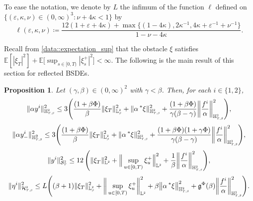 \documentclass[10pt]{article} %
\newtheorem{proposition}[theorem]{Proposition}
\newcommand\cH{\mathcal H}
\newcommand\cS{\mathcal S}
\newcommand{\smalltext}[1]{\text{\fontsize{4}{4}\selectfont$#1$}}
\newcommand\fg{\mathfrak g}
\def \E{\mathbb{E}}
\def \H{\mathbb{H}}
\def \L{\mathbb{L}}
\newcommand{\brs}[1]{\prescript{\ast}{}{#1}}
\begin{document}
To ease the notation, we denote by $L$ the infimum of the function $\ell$ defined on $\{(\varepsilon,\kappa,\nu) \in (0,\infty)^3 : \nu + 4\kappa < 1\}$ by
\begin{equation*}
	\ell(\varepsilon,\kappa,\nu) \coloneqq \frac{12(1+\varepsilon+4\kappa) + \max\{(1-4\kappa),2\kappa^{-1},4\kappa+\varepsilon^{-1}+\nu^{-1}\}}{1-\nu-4\kappa}.
\end{equation*}

Recall from \ref{data::expectation_sup} that the obstacle $\xi$ satisfies $\E[|\xi_T|^2] + \E\big[ \sup_{s \in [0,T)} |\xi^+_s|^2  \big] < \infty.$ The following is the main result of this section for reflected BSDEs.
\begin{proposition}\label{prop::apriori}
	Let $(\gamma,\beta) \in (0,\infty)^2$ with $\gamma < \beta$. Then, for each $i \in \{1,2\}$,
	\begin{equation*}
		\|\alpha y^i\|_{\mathbb{H}^{\smalltext{2}}_{\smalltext{T}\smalltext{,}\smalltext{\beta}}}^2 
		\leq 3 \Bigg( \frac{(1+\beta\Phi)}{\beta} \|\xi_T\|^2_{\L^\smalltext{2}_\smalltext{\beta}} + \|\alpha\brs{\xi}\|^2_{\H^\smalltext{2}_{\smalltext{T}\smalltext{,}\smalltext{\beta}}} +  \frac{(1+\beta\Phi)}{\gamma(\beta-\gamma)} \bigg\| \frac{f^i}{\alpha} \bigg\|^2_{\H^{\smalltext{2}}_{\smalltext{T}\smalltext{,}\smalltext{\beta}}} \Bigg),
	\end{equation*}
	\begin{equation*}
		\|\alpha y^i_-\|^2_{\H^2_{\smalltext{T}\smalltext{,}\smalltext{\beta}}} 
		\leq 3 \Bigg( \frac{(1+\beta\Phi)}{\beta} \|\xi_T\|^2_{\L^\smalltext{2}_\smalltext{\beta}} + \|\alpha\brs{\xi}\|^2_{\H^\smalltext{2}_{\smalltext{T}\smalltext{,}\smalltext{\beta}}} +  \frac{(1+\beta\Phi)(1+\gamma\Phi)}{\gamma(\beta-\gamma)} \bigg\| \frac{f^i}{\alpha} \bigg\|^2_{\H^{\smalltext{2}}_{\smalltext{T}\smalltext{,}\smalltext{\beta}}} \Bigg),
	\end{equation*}
	\begin{equation*}
		\|y^i\|^2_{\cS^\smalltext{2}_\smalltext{T}} \leq 12 \, \Bigg(\|\xi_T\|^2_{\L^\smalltext{2}} + \Big\|\sup_{u \in [0,T)} \xi^+_u\Big\|^2_{\L^\smalltext{2}} +  \frac{1}{\beta}\bigg\|\frac{f^i}{\alpha}\bigg\|^2_{\H^\smalltext{2}_{\smalltext{T}\smalltext{,}\smalltext{\beta}}}\Bigg),
	\end{equation*}
	\begin{equation*}
		\|\eta^i\|^2_{\cH^\smalltext{2}_{\smalltext{T}\smalltext{,}\smalltext{\beta}}} 
		\leq L \Bigg( (\beta + 1) \|\xi_T\|^2_{\L^\smalltext{2}_\smalltext{\beta}} +\bigg\|\sup_{u \in [0,T)} \xi^+_u\bigg\|^2_{\L^\smalltext{2}} + \beta \big\|\alpha \brs{\xi} \big\|_{\H^\smalltext{2}_{\smalltext{T}\smalltext{,}\smalltext{\beta}}}^2 + \fg^\Phi(\beta)\bigg\| \frac{f^i}{\alpha} \bigg\|^2_{\H^{\smalltext{2}}_{\smalltext{T}\smalltext{,}\smalltext{\beta}}}\Bigg).

\end{equation*}
\end{proposition}
\end{document}
